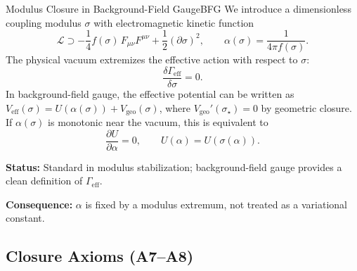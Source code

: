 \begin{axiom}{Modulus Closure in Background-Field Gauge}{BFG}
We introduce a dimensionless coupling modulus $\sigma$ with electromagnetic kinetic function
\begin{equation}
    \mathcal{L} \supset -\frac{1}{4} f(\sigma)\,F_{\mu\nu}F^{\mu\nu}
    + \frac{1}{2}(\partial\sigma)^2,
    \qquad 
    \alpha(\sigma)=\frac{1}{4\pi f(\sigma)}.
\end{equation}
The physical vacuum extremizes the effective action with respect to $\sigma$:
\begin{equation}
    \frac{\delta\Gamma_{\mathrm{eff}}}{\delta\sigma}=0.
\end{equation}
In background-field gauge, the effective potential can be written as
$V_{\mathrm{eff}}(\sigma)=U(\alpha(\sigma)) + V_{\mathrm{geo}}(\sigma)$, where
$V_{\mathrm{geo}}'(\sigma_\star)=0$ by geometric closure.
If $\alpha(\sigma)$ is monotonic near the vacuum, this is equivalent to
\begin{equation}
    \frac{\partial U}{\partial \alpha}=0,
    \qquad U(\alpha)=U(\sigma(\alpha)).
\end{equation}

\tcblower
\textbf{Status:} Standard in modulus stabilization; background-field gauge provides a clean definition of $\Gamma_{\mathrm{eff}}$.

\textbf{Consequence:} $\alpha$ is fixed by a modulus extremum, not treated as a variational constant.
\end{axiom}

\subsection{Closure Axioms (A7--A8)}

